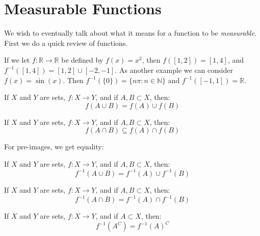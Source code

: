 \section{Measurable Functions}
    We wish to eventually talk about what it means for a function to be
    \textit{measurable}. First we do a quick review of functions.
    \begin{lexample}
        If we let $f:\mathbb{R}\rightarrow\mathbb{R}$ be defined by
        $f(x)=x^{2}$, then $f([1,2])=[1,4]$, and
        $f^{-1}([1,4])=[1,2]\cup[-2,-1]$. As another example we can consider
        $f(x)=\sin(x)$. Then $f^{-1}(\{0\})=\{n\pi:n\in\mathbb{N}\}$ and
        $f^{-1}([-1,1])=\mathbb{R}$.
    \end{lexample}
    \begin{theorem}
        If $X$ and $Y$ are sets, $f:X\rightarrow{Y}$, and if $A,B\subset{X}$,
        then:
        \begin{equation}
            f(A\cup{B})=f(A)\cup{f}(B)
        \end{equation}
    \end{theorem}
    \begin{theorem}
        If $X$ and $Y$ are sets, $f:X\rightarrow{Y}$, and if $A,B\subset{X}$,
        then:
        \begin{equation}
            f(A\cap{B})\subseteq{f(A)\cap{f}(B)}
        \end{equation}
    \end{theorem}
    For pre-images, we get equality:
    \begin{theorem}
        If $X$ and $Y$ are sets, $f:X\rightarrow{Y}$, and if $A,B\subset{X}$,
        then:
        \begin{equation}
            f^{-1}(A\cup{B})=f^{-1}(A)\cup{f}^{-1}(B)
        \end{equation}
    \end{theorem}
    \begin{theorem}
        If $X$ and $Y$ are sets, $f:X\rightarrow{Y}$, and if $A,B\subset{X}$,
        then:
        \begin{equation}
            f^{-1}(A\cap{B})=f^{-1}(A)\cap{f}^{-1}(B)
        \end{equation}
    \end{theorem}
    \begin{theorem}
        If $X$ and $Y$ are sets, $f:X\rightarrow{Y}$, and if $A\subset{X}$,
        then:
        \begin{equation}
            f^{-1}(A^{C})=f^{-1}(A)^{C}
        \end{equation}
    \end{theorem}
